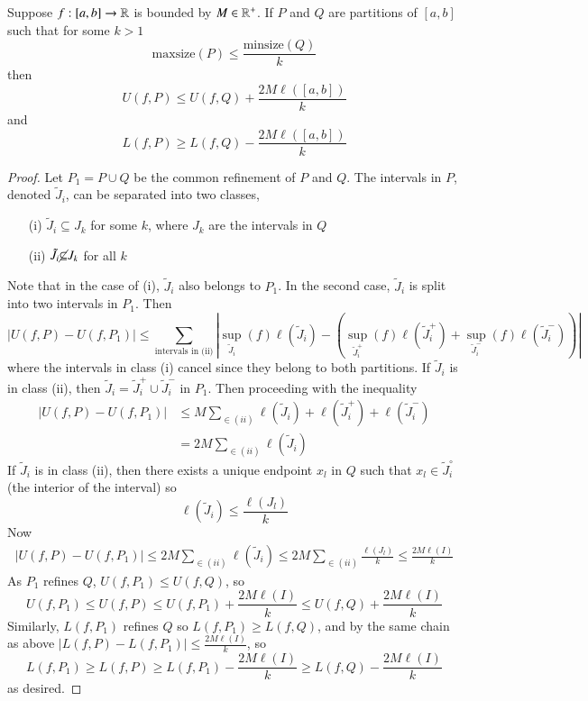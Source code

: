 \begin{proposition}
    Suppose $f:[a,b]\rightarrow \mathbb R$ is bounded by $M \in \mathbb R^+$. If $P$ and $Q$ are partitions of $[a,b]$ such that for some $k > 1$ $$\text{maxsize}(P) \leq \frac{\text{minsize}(Q)}{k}$$ then $$U(f,P) \leq U(f,Q) + \frac{2M\ell([a,b])}{k}$$ and $$L(f,P) \geq L(f,Q) - \frac{2M\ell([a,b])}{k}$$
\end{proposition}
\begin{proof}
    Let $P_1 = P\cup Q$ be the common refinement of $P$ and $Q$. The intervals in $P$, denoted $\tilde{J}_i$, can be separated into two classes, \begin{enumerate}
        \item[(i)] $\tilde{J}_i \subseteq J_k$ for some $k$, where $J_k$ are the intervals in $Q$
        \item[(ii)] $\tilde{J}_i\cancel{\subseteq} J_k$ for all $k$
    \end{enumerate}
    Note that in the case of (i), $\tilde{J}_i$ also belongs to $P_1$. In the second case, $\tilde{J}_i$ is split into two intervals in $P_1$. Then $$|U(f,P) - U(f,P_1)| \leq \sum_{\text{intervals in (ii)}}|\sup_{\tilde{J}_i}(f)\ell(\tilde{J}_i) - (\sup_{\tilde{J}_i^+}(f)\ell(\tilde{J}_i^+) + \sup_{\tilde{J}_i^-}(f)\ell(\tilde{J}_i^-))|$$ where the intervals in class (i) cancel since they belong to both partitions. If $\tilde{J}_i$ is in class (ii), then $\tilde{J}_i = \tilde{J}_i^+\cup\tilde{J}_i^-$ in $P_1$. Then proceeding with the inequality \begin{align*}
        |U(f,P) - U(f,P_1)| &\leq M\sum_{\in (ii)}\ell(\tilde{J}_i) + \ell(\tilde{J}_i^+) + \ell(\tilde{J}_i^-) \\
        &= 2M\sum_{\in (ii)}\ell(\tilde{J}_i)
    \end{align*}
    If $\tilde{J}_i$ is in class (ii), then there exists a unique endpoint $x_l$ in $Q$ such that $x_l \in \tilde{J}_i^{\circ}$ (the interior of the interval) so $$\ell(\tilde{J}_i) \leq \frac{\ell(J_l)}{k}$$ Now \begin{align*}
        |U(f,P) - U(f,P_1)| \leq 2M\sum_{\in (ii)}\ell(\tilde{J}_i) \leq 2M\sum_{\in (ii)}\frac{\ell(J_l)}{k} \leq \frac{2M\ell(I)}{k}
    \end{align*}
    As $P_1$ refines $Q$, $U(f,P_1) \leq U(f,Q)$, so $$U(f,P_1) \leq U(f,P) \leq U(f,P_1) + \frac{2M\ell(I)}{k} \leq U(f,Q) + \frac{2M\ell(I)}{k}$$ Similarly, $L(f,P_1)$ refines $Q$ so $L(f,P_1) \geq L(f,Q)$, and by the same chain as above $|L(f,P) - L(f,P_1)| \leq \frac{2M\ell(I)}{k}$, so $$L(f,P_1) \geq L(f,P) \geq L(f,P_1) - \frac{2M\ell(I)}{k} \geq L(f,Q) - \frac{2M\ell(I)}{k}$$ as desired.
\end{proof}

